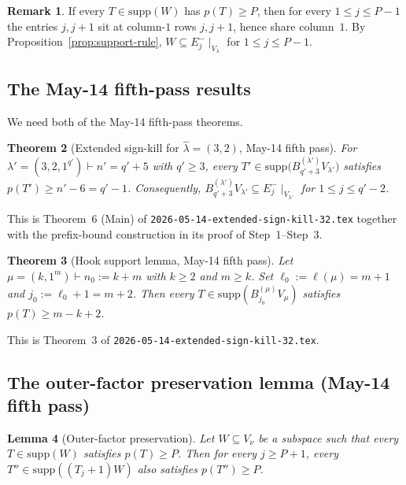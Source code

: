 \documentclass[11pt]{article}
\newtheorem{theorem}{Theorem}
\newtheorem{lemma}[theorem]{Lemma}
\theoremstyle{definition}
\newtheorem{remark}[theorem]{Remark}
\newcommand{\hatl}{\widehat\lambda}
\newcommand{\supp}{\mathrm{supp}}
\begin{document}
\begin{remark}\label{rem:prefix-implies-Ej-}
If every $T \in \supp(W)$ has $p(T) \ge P$, then for every
$1 \le j \le P - 1$ the entries $j, j+1$ sit at column-$1$ rows
$j, j+1$, hence share column~$1$.  By Proposition~\ref{prop:support-rule},
$W \subseteq E_j^-\!\mid_{V_\lambda}$ for $1 \le j \le P - 1$.
\end{remark}

\subsection{The May-14 fifth-pass results}

We need both of the May-14 fifth-pass theorems.

\begin{theorem}[Extended sign-kill for $\hatl = (3, 2)$, May-14 fifth pass]\label{thm:32-prefix}
For $\lambda' = (3, 2, 1^{q'}) \vdash n' = q' + 5$ with $q' \ge 3$,
every $T' \in \supp\bigl(B^{(\lambda')}_{q'+3} V_{\lambda'}\bigr)$
satisfies $p(T') \ge n' - 6 = q' - 1$.  Consequently,
$B^{(\lambda')}_{q'+3} V_{\lambda'} \subseteq E_j^-\!\mid_{V_{\lambda'}}$
for $1 \le j \le q' - 2$.
\end{theorem}

This is Theorem~6 (Main) of \texttt{2026-05-14-extended-sign-kill-32.tex}
together with the prefix-bound construction in its proof of Step~1--Step~3.

\begin{theorem}[Hook support lemma, May-14 fifth pass]\label{thm:hook-support}
Let $\mu = (k, 1^m) \vdash n_0 := k + m$ with $k \ge 2$ and $m \ge k$.
Set $\ell_0 := \ell(\mu) = m + 1$ and $j_0 := \ell_0 + 1 = m + 2$.
Then every $T \in \supp(B^{(\mu)}_{j_0} V_\mu)$ satisfies
$p(T) \ge m - k + 2$.
\end{theorem}

This is Theorem~3 of \texttt{2026-05-14-extended-sign-kill-32.tex}.

\subsection{The outer-factor preservation lemma (May-14 fifth pass)}

\begin{lemma}[Outer-factor preservation]\label{lem:outer-preserve}
Let $W \subseteq V_\nu$ be a subspace such that every $T \in \supp(W)$
satisfies $p(T) \ge P$.  Then for every $j \ge P + 1$,
every $T'' \in \supp((T_j{+}1) W)$ also satisfies $p(T'') \ge P$.
\end{lemma}
\end{document}
